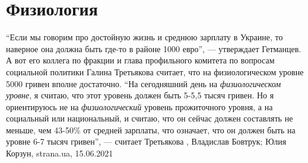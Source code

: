  
 
 
 
 
\chapter{Физиология}
\label{sec:slova.fiziologia}

\enquote{Если мы говорим про достойную жизнь и среднюю зарплату в Украине, то
наверное она должна быть где-то в районе 1000 евро}, — утверждает Гетманцев.  А
вот его коллега по фракции и глава профильного комитета по вопросам социальной
политики Галина Третьякова считает, что на физиологическом уровне 5000 гривен
вполне достаточно.  \enquote{На сегодняшний день на \emph{физиологическом уровне}, я
считаю, что этот уровень должен быть 5-5,5 тысяч гривен. Но я ориентируюсь не
на \emph{физиологический} уровень прожиточного уровня, а на социальный или
национальный, и считаю, что он сейчас должен составлять не меньше, чем 43-50\%
от средней зарплаты, что означает, что он должен быть на уровне 6-7 тысяч
гривен}, — считает Третьякова
, 
Владислав Бовтрук; Юлия Корзун, strana.ua, 15.06.2021

